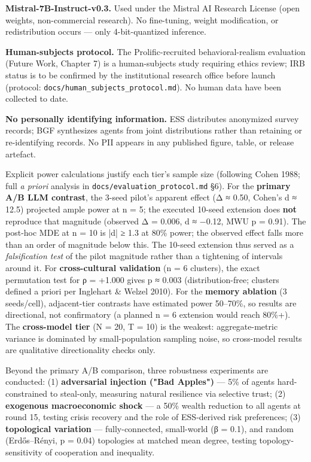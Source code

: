 \textbf{Mistral-7B-Instruct-v0.3.} Used under the Mistral AI Research License (open weights, non-commercial research). No fine-tuning, weight modification, or redistribution occurs — only 4-bit-quantized inference.

\textbf{Human-subjects protocol.} The Prolific-recruited behavioral-realism evaluation (Future Work, Chapter 7) is a human-subjects study requiring ethics review; IRB status is to be confirmed by the institutional research office before launch (protocol: \texttt{docs/human\_subjects\_protocol.md}). No human data have been collected to date.

\textbf{No personally identifying information.} ESS distributes anonymized survey records; BGF synthesizes agents from joint distributions rather than retaining or re-identifying records. No PII appears in any published figure, table, or release artefact.


Explicit power calculations justify each tier's sample size (following Cohen 1988; full \textit{a priori} analysis in \texttt{docs/evaluation\_protocol.md} §6). For the \textbf{primary A/B LLM contrast}, the 3-seed pilot's apparent effect (Δ ≈ 0.50, Cohen's d ≈ 12.5) projected ample power at n = 5; the executed 10-seed extension does \textbf{not} reproduce that magnitude (observed Δ = 0.006, d ≈ −0.12, MWU p = 0.91). The post-hoc MDE at n = 10 is |d| ≥ 1.3 at 80\% power; the observed effect falls more than an order of magnitude below this. The 10-seed extension thus served as a \textit{falsification test} of the pilot magnitude rather than a tightening of intervals around it. For \textbf{cross-cultural validation} (n = 6 clusters), the exact permutation test for ρ = +1.000 gives p ≈ 0.003 (distribution-free; clusters defined a priori per Inglehart \& Welzel 2010). For the \textbf{memory ablation} (3 seeds/cell), adjacent-tier contrasts have estimated power 50–70\%, so results are directional, not confirmatory (a planned n = 6 extension would reach 80\%+). The \textbf{cross-model tier} (N = 20, T = 10) is the weakest: aggregate-metric variance is dominated by small-population sampling noise, so cross-model results are qualitative directionality checks only.


Beyond the primary A/B comparison, three robustness experiments are conducted: (1) \textbf{adversarial injection ("Bad Apples")} — 5\% of agents hard-constrained to steal-only, measuring natural resilience via selective trust; (2) \textbf{exogenous macroeconomic shock} — a 50\% wealth reduction to all agents at round 15, testing crisis recovery and the role of ESS-derived risk preferences; (3) \textbf{topological variation} — fully-connected, small-world (β = 0.1), and random (Erdős–Rényi, p = 0.04) topologies at matched mean degree, testing topology-sensitivity of cooperation and inequality.

